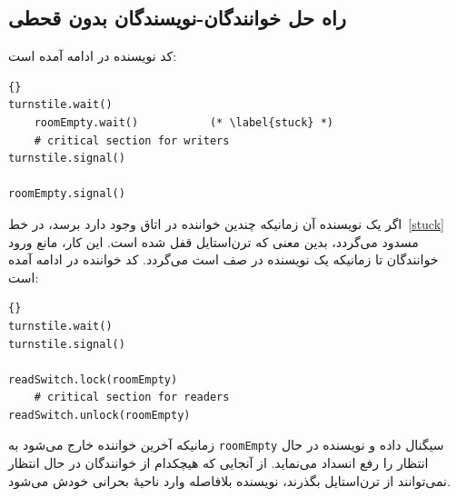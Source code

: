 \documentclass{book}
\newcommand{\clearemptydoublepage}{\newpage\cleardoublepage}
\begin{document}
\clearemptydoublepage
\subsection{راه حل خوانندگان-نویسندگان بدون قحطی}  

    کد نویسنده در ادامه آمده است: 

\begin{latin}
\begin{latin}
\begin{lstlisting}[title=\rl{راه حل نویسنده بدون قحطی}]{}
turnstile.wait()
    roomEmpty.wait()           (* \label{stuck} *)
    # critical section for writers
turnstile.signal()

roomEmpty.signal()
\end{lstlisting}
\end{latin}
\end{latin}

    اگر یک نویسنده آن زمانیکه چندین خواننده در اتاق وجود دارد برسد، در خط~\ref{stuck} مسدود می‌گردد، بدین معنی که ترن‌استایل قفل شده است. 
    این کار، مانع ورود خوانندگان تا زمانیکه یک نویسنده در صف است می‌گردد. کد خواننده در ادامه آمده است: 

\begin{latin}
\begin{latin}
\begin{lstlisting}[title=\rl{راه حل خواننده بدون قطحی}]{}
turnstile.wait()
turnstile.signal()

readSwitch.lock(roomEmpty)
    # critical section for readers
readSwitch.unlock(roomEmpty)
\end{lstlisting}
\end{latin}
\end{latin}

    زمانیکه آخرین خواننده خارج می‌شود به {\tt roomEmpty} سیگنال داده و نویسنده در حال انتظار را رفع انسداد می‌نماید. 
    از آنجایی که هیچکدام از خوانندگان در حال انتظار نمی‌توانند از ترن‌استایل بگذرند، نویسنده بلافاصله وارد ناحیهٔ بحرانی خودش می‌شود. 
\end{document}
